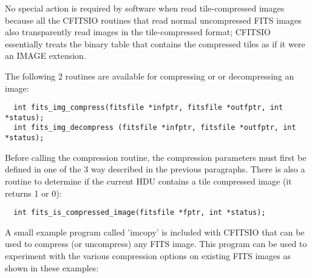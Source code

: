 \documentclass[11pt]{book}
\begin{document}
No special action is required by software when read tile-compressed images because
all the CFITSIO routines that read normal uncompressed FITS images also
transparently read images in the tile-compressed format;  CFITSIO essentially
treats the binary table that contains the compressed tiles as if
it were an IMAGE extension.


The following 2 routines are available for compressing or
or decompressing an image:

\begin{verbatim}
  int fits_img_compress(fitsfile *infptr, fitsfile *outfptr, int *status);
  int fits_img_decompress (fitsfile *infptr, fitsfile *outfptr, int *status);
\end{verbatim}
Before calling the compression routine, the compression parameters must
first be defined in one of the 3 way described in the previous paragraphs.
There is also a routine to determine if the current HDU contains
a tile compressed image (it returns 1 or 0):

\begin{verbatim}
  int fits_is_compressed_image(fitsfile *fptr, int *status);
\end{verbatim}
A small example program called 'imcopy' is included with CFITSIO that
can be used to compress (or uncompress) any FITS image.  This
program can be used to experiment with the various compression options
on existing FITS images as shown in these examples:
\end{document}
